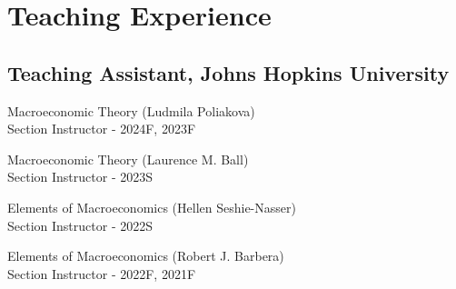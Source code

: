 
\section{Teaching Experience}
\vspace{-0.25in}

\subsection*{Teaching Assistant, Johns Hopkins University}
\begin{outerlist}
	\item Macroeconomic Theory (Ludmila Poliakova) \\
    Section Instructor - 2024F, 2023F
	\item Macroeconomic Theory (Laurence M. Ball) \\
    Section Instructor - 2023S
    \item Elements of Macroeconomics (Hellen Seshie-Nasser) \\
    Section Instructor - 2022S
    \item Elements of Macroeconomics (Robert J. Barbera) \\
    Section Instructor - 2022F, 2021F
\end{outerlist}